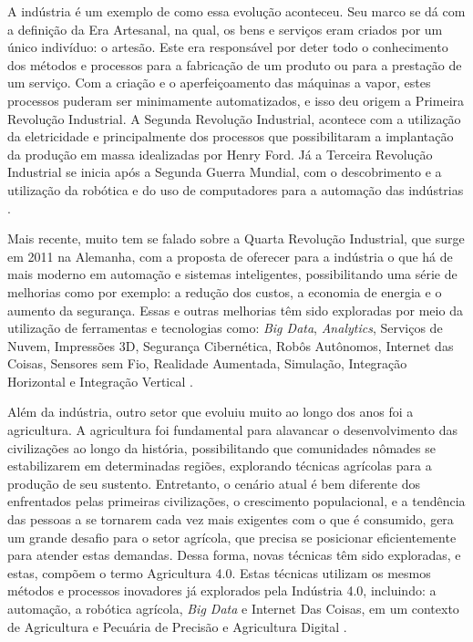 \documentclass[12pt]{article}
\begin{document}
A indústria é um exemplo de como essa evolução aconteceu. Seu marco se dá com a definição da Era Artesanal, na qual, os bens e serviços eram criados por um único indivíduo: o artesão. Este era responsável por deter todo o conhecimento dos métodos e processos para a fabricação de um produto ou para a prestação de um serviço. Com a criação e o aperfeiçoamento das máquinas a vapor, estes processos puderam ser minimamente automatizados, e isso deu origem a Primeira Revolução Industrial. A Segunda Revolução Industrial, acontece com a utilização da eletricidade e principalmente dos processos que possibilitaram a implantação da produção em massa idealizadas por Henry Ford. Já a Terceira Revolução Industrial se inicia após a Segunda Guerra Mundial, com o descobrimento e a utilização da robótica e do uso de computadores para a automação das indústrias \cite{Souza:2017}.

Mais recente, muito tem se falado sobre a Quarta Revolução Industrial, que surge em 2011 na Alemanha, com a proposta de oferecer para a indústria o que há de mais moderno em automação e sistemas inteligentes, possibilitando uma série de melhorias como por exemplo: a redução dos custos, a economia de energia e o aumento da segurança. Essas e outras melhorias têm sido exploradas por meio da utilização de ferramentas e tecnologias como: \textit{Big Data}, \textit{Analytics}, Serviços de Nuvem, Impressões 3D, Segurança Cibernética, Robôs Autônomos, Internet das Coisas, Sensores sem Fio, Realidade Aumentada, Simulação, Integração Horizontal e Integração Vertical \cite{Souza:2017}.

Além da indústria, outro setor que evoluiu muito ao longo dos anos foi a agricultura. A agricultura foi fundamental para alavancar o desenvolvimento das civilizações ao longo da história, possibilitando que comunidades nômades se estabilizarem em determinadas regiões, explorando técnicas agrícolas para a produção de seu sustento. Entretanto, o cenário atual é bem diferente dos enfrentados pelas primeiras civilizações, o crescimento populacional, e a tendência das pessoas a se tornarem cada vez mais exigentes com o que é consumido, gera um grande desafio para o setor agrícola, que precisa se posicionar eficientemente para atender estas demandas. Dessa forma, novas técnicas têm sido exploradas, e estas, compõem o termo Agricultura 4.0. Estas técnicas utilizam os mesmos métodos e processos inovadores já explorados pela Indústria 4.0, incluindo: a automação, a robótica agrícola, \textit{Big Data} e Internet Das Coisas, em um contexto de Agricultura e Pecuária de Precisão e Agricultura Digital \cite{Ribeiro:2018}.
\end{document}
